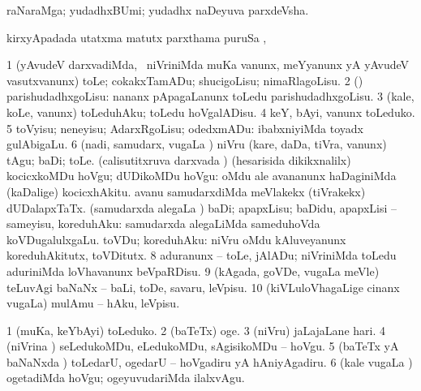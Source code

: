 \bentry
{} 
\gl{\nA}
\expl{}
\bmng
raNaraMga; yudadhxBUmi; yudadhx naDeyuva parxdeVsha. 
\emng
\eentry

\bentry
{} 
\gl{\kirx}
\expl{}
\bmng
{} kirxyApadada utatxma matutx parxthama puruSa \Eva, \udA\  
\emng
\eentry

\bentry
{} 
\gl{\sakirx}
\expl{}
\bmng
\bnum
\num{1} (yAvudeV darxvadiMda, \kanmu\ niVriniMda muKa \mo vanunx, meYyanunx yA yAvudeV vasutxvanunx) toLe; cokakxTamADu; shucigoLisu; nimaRlagoLisu. 
\num{2} (\rUpa) parishudadhxgoLisu:  nananx pApagaLanunx toLedu parishudadhxgoLisu. 
\num{3} (kale, koLe, \mo vanunx) toLeduhAku; toLedu hoVgalADisu. 
\num{4} keY, bAyi, \mo vanunx toLeduko. 
\num{5} toVyisu; neneyisu; AdarxRgoLisu; odedxmADu:  ibabxniyiMda toyadx gulAbigaLu. 
\num{6} (nadi, samudarx, \mo vugaLa \vi) niVru (kare, daDa, tiVra, \mo vanunx) tAgu; baDi; toLe. 
\banum
{} (calisutitxruva darxvada \vi) (hesarisida dikikxnalilx) kocicxkoMDu hoVgu; dUDikoMDu hoVgu:  oMdu ale avananunx haDaginiMda (kaDalige) kocicxhAkitu.  avanu samudarxdiMda meVlakekx (tiVrakekx) dUDalapxTaTx. 
 (samudarxda alegaLa \vi) baDi; apapxLisu; baDidu, apapxLisi -- sameyisu, koreduhAku:  samudarxda alegaLiMda sameduhoVda koVDugalulxgaLu. 
 toVDu; koreduhAku:  niVru oMdu kAluveyanunx koreduhAkitutx, toVDitutx. 
\eanum
\numie
\num{8} aduranunx -- toLe, jAlADu; niVriniMda toLedu aduriniMda loVhavanunx beVpaRDisu. 
\num{9} (kAgada, goVDe, \mo vugaLa meVle) teLuvAgi baNaNx -- baLi, toDe, savaru, leVpisu. 
\num{10} (kiVLuloVhagaLige cinanx \mo vugaLa) mulAmu -- hAku, leVpisu. 
\enum
\emng

\noindent 
\gl{\akirx}
\expl{}
\bmng
\bnum
\num{1} (muKa, keYbAyi) toLeduko. 
\num{2} (baTeTx) oge. 
\num{3} (niVru) jaLajaLane hari. 
\num{4} (niVrina \vi) seLedukoMDu, eLedukoMDu, sAgisikoMDu -- hoVgu. 
\num{5} (baTeTx yA baNaNxda \vi) toLedarU, ogedarU -- hoVgadiru yA hAniyAgadiru. 
\num{6} (kale \mo vugaLa \vi) ogetadiMda hoVgu; ogeyuvudariMda ilalxvAgu. 
\enum
\emng

